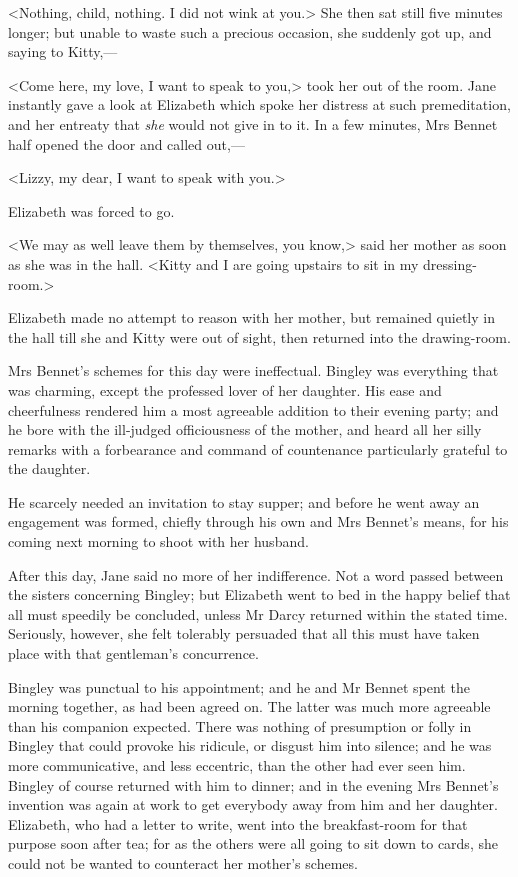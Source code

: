 <Nothing, child, nothing. I did not wink at you.> She then sat still five minutes longer; but unable to waste such a precious occasion, she suddenly got up, and saying to Kitty,—

<Come here, my love, I want to speak to you,> took her out of the room. Jane instantly gave a look at Elizabeth which spoke her distress at such premeditation, and her entreaty that \textit{she} would not give in to it. In a few minutes, Mrs Bennet half opened the door and called out,—

<Lizzy, my dear, I want to speak with you.>

Elizabeth was forced to go.

<We may as well leave them by themselves, you know,> said her mother as soon as she was in the hall. <Kitty and I are going upstairs to sit in my dressing-room.>

Elizabeth made no attempt to reason with her mother, but remained quietly in the hall till she and Kitty were out of sight, then returned into the drawing-room.

Mrs Bennet's schemes for this day were ineffectual. Bingley was everything that was charming, except the professed lover of her daughter. His ease and cheerfulness rendered him a most agreeable addition to their evening party; and he bore with the ill-judged officiousness of the mother, and heard all her silly remarks with a forbearance and command of countenance particularly grateful to the daughter.

He scarcely needed an invitation to stay supper; and before he went away an engagement was formed, chiefly through his own and Mrs Bennet's means, for his coming next morning to shoot with her husband.

After this day, Jane said no more of her indifference. Not a word passed between the sisters concerning Bingley; but Elizabeth went to bed in the happy belief that all must speedily be concluded, unless Mr Darcy returned within the stated time. Seriously, however, she felt tolerably persuaded that all this must have taken place with that gentleman's concurrence.

Bingley was punctual to his appointment; and he and Mr Bennet spent the morning together, as had been agreed on. The latter was much more agreeable than his companion expected. There was nothing of presumption or folly in Bingley that could provoke his ridicule, or disgust him into silence; and he was more communicative, and less eccentric, than the other had ever seen him. Bingley of course returned with him to dinner; and in the evening Mrs Bennet's invention was again at work to get everybody away from him and her daughter. Elizabeth, who had a letter to write, went into the breakfast-room for that purpose soon after tea; for as the others were all going to sit down to cards, she could not be wanted to counteract her mother's schemes.

